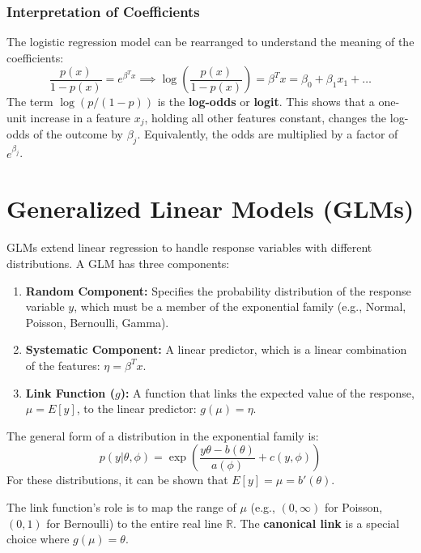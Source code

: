 \documentclass{article}
\begin{document}
\begin{multicols}{2}
	\subsubsection{Interpretation of Coefficients}
	The logistic regression model can be rearranged to understand the meaning of the coefficients:
	$$ \frac{p(x)}{1-p(x)} = e^{\beta^T x} \implies \log\left(\frac{p(x)}{1-p(x)}\right) = \beta^T x = \beta_0 + \beta_1 x_1 + \dots $$
	The term $\log(p / (1-p))$ is the \textbf{log-odds} or \textbf{logit}. This shows that a one-unit increase in a feature $x_j$, holding all other features constant, changes the log-odds of the outcome by $\beta_j$. Equivalently, the odds are multiplied by a factor of $e^{\beta_j}$.

	\section{Generalized Linear Models (GLMs)}
	GLMs extend linear regression to handle response variables with different distributions. A GLM has three components:
	\begin{enumerate}
		\item \textbf{Random Component:} Specifies the probability distribution of the response variable $y$, which must be a member of the exponential family (e.g., Normal, Poisson, Bernoulli, Gamma).
		\item \textbf{Systematic Component:} A linear predictor, which is a linear combination of the features: $\eta = \beta^T x$.
		\item \textbf{Link Function ($g$):} A function that links the expected value of the response, $\mu = E[y]$, to the linear predictor: $g(\mu) = \eta$.
	\end{enumerate}
	The general form of a distribution in the exponential family is:
	$$ p(y|\theta, \phi) = \exp\left(\frac{y\theta - b(\theta)}{a(\phi)} + c(y, \phi)\right) $$
	For these distributions, it can be shown that $E[y] = \mu = b'(\theta)$.

	The link function's role is to map the range of $\mu$ (e.g., $(0, \infty)$ for Poisson, $(0, 1)$ for Bernoulli) to the entire real line $\mathbb{R}$. The \textbf{canonical link} is a special choice where $g(\mu) = \theta$.


\end{multicols}
\end{document}

